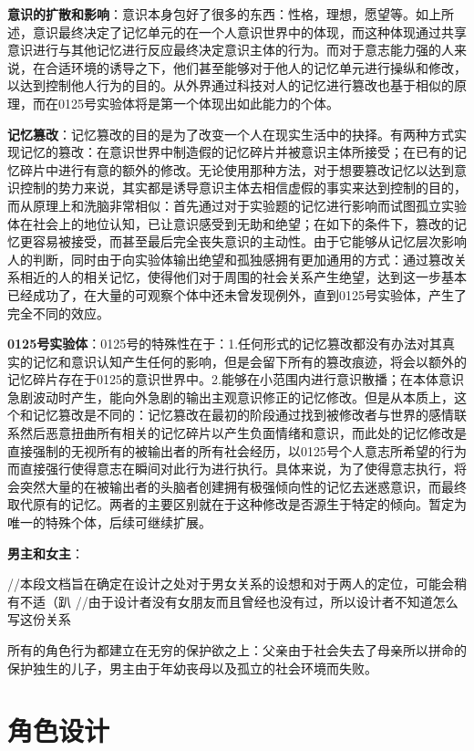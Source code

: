 \documentclass[12pt, a4paper]{article}
\begin{document}
        \medskip
        \textbf{意识的扩散和影响}：意识本身包好了很多的东西：性格，理想，愿望等。如上所述，意识最终决定了记忆单元的在一个人意识世界中的体现，而这种体现通过共享意识进行与其他记忆进行反应最终决定意识主体的行为。而对于意志能力强的人来说，在合适环境的诱导之下，他们甚至能够对于他人的记忆单元进行操纵和修改，以达到控制他人行为的目的。从外界通过科技对人的记忆进行篡改也基于相似的原理，而在0125号实验体将是第一个体现出如此能力的个体。

        \medskip
        \textbf{记忆篡改}：记忆篡改的目的是为了改变一个人在现实生活中的抉择。有两种方式实现记忆的篡改：在意识世界中制造假的记忆碎片并被意识主体所接受；在已有的记忆碎片中进行有意的额外的修改。无论使用那种方法，对于想要篡改记忆以达到意识控制的势力来说，其实都是诱导意识主体去相信虚假的事实来达到控制的目的，而从原理上和洗脑非常相似：首先通过对于实验题的记忆进行影响而试图孤立实验体在社会上的地位认知，已让意识感受到无助和绝望；在如下的条件下，篡改的记忆更容易被接受，而甚至最后完全丧失意识的主动性。由于它能够从记忆层次影响人的判断，同时由于向实验体输出绝望和孤独感拥有更加通用的方式：通过篡改关系相近的人的相关记忆，使得他们对于周围的社会关系产生绝望，达到这一步基本已经成功了，在大量的可观察个体中还未曾发现例外，直到0125号实验体，产生了完全不同的效应。
        
        \textbf{0125号实验体}：0125号的特殊性在于：1.任何形式的记忆篡改都没有办法对其真实的记忆和意识认知产生任何的影响，但是会留下所有的篡改痕迹，将会以额外的记忆碎片存在于0125的意识世界中。2.能够在小范围内进行意识散播；在本体意识急剧波动时产生，能向外急剧的输出主观意识修正的记忆修改。但是从本质上，这个和记忆篡改是不同的：记忆篡改在最初的阶段通过找到被修改者与世界的感情联系然后恶意扭曲所有相关的记忆碎片以产生负面情绪和意识，而此处的记忆修改是直接强制的无视所有的被输出者的所有社会经历，以0125号个人意志所希望的行为而直接强行使得意志在瞬间对此行为进行执行。具体来说，为了使得意志执行，将会突然大量的在被输出者的头脑者创建拥有极强倾向性的记忆去迷惑意识，而最终取代原有的记忆。两者的主要区别就在于这种修改是否源生于特定的倾向。暂定为唯一的特殊个体，后续可继续扩展。

        \textbf{男主和女主}：

        //本段文档旨在确定在设计之处对于男女关系的设想和对于两人的定位，可能会稍有不适（趴
        //由于设计者没有女朋友而且曾经也没有过，所以设计者不知道怎么写这份关系

        所有的角色行为都建立在无穷的保护欲之上：父亲由于社会失去了母亲所以拼命的保护独生的儿子，男主由于年幼丧母以及孤立的社会环境而失败。

    \newpage        
    \section*{角色设计}
\end{document}
